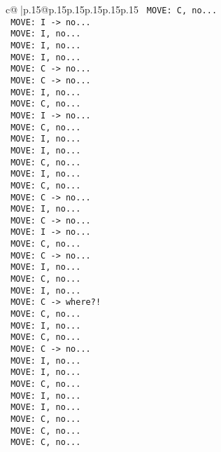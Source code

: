 \documentclass{article}
\begin{document}
{\begin{supertabular}{c@{$\;$}|p{.15\linewidth}@{}p{.15\linewidth}p{.15\linewidth}p{.15\linewidth}p{.15\linewidth}p{.15\linewidth}}
{{{\texttt{ MOVE: C, no...} \\
\texttt{ MOVE: I {-}> no...} \\
\texttt{ MOVE: I, no...} \\
\texttt{ MOVE: I, no...} \\
\texttt{ MOVE: I, no...} \\
\texttt{ MOVE: C {-}> no...} \\
\texttt{ MOVE: C {-}> no...} \\
\texttt{ MOVE: I, no...} \\
\texttt{ MOVE: C, no...} \\
\texttt{ MOVE: I {-}> no...} \\
\texttt{ MOVE: C, no...} \\
\texttt{ MOVE: I, no...} \\
\texttt{ MOVE: I, no...} \\
\texttt{ MOVE: C, no...} \\
\texttt{ MOVE: I, no...} \\
\texttt{ MOVE: C, no...} \\
\texttt{ MOVE: C {-}> no...} \\
\texttt{ MOVE: I, no...} \\
\texttt{ MOVE: C {-}> no...} \\
\texttt{ MOVE: I {-}> no...} \\
\texttt{ MOVE: C, no...} \\
\texttt{ MOVE: C {-}> no...} \\
\texttt{ MOVE: I, no...} \\
\texttt{ MOVE: C, no...} \\
\texttt{ MOVE: I, no...} \\
\texttt{ MOVE: C {-}> where?!} \\
\texttt{ MOVE: C, no...} \\
\texttt{ MOVE: I, no...} \\
\texttt{ MOVE: C, no...} \\
\texttt{ MOVE: C {-}> no...} \\
\texttt{ MOVE: I, no...} \\
\texttt{ MOVE: I, no...} \\
\texttt{ MOVE: C, no...} \\
\texttt{ MOVE: I, no...} \\
\texttt{ MOVE: I, no...} \\
\texttt{ MOVE: C, no...} \\
\texttt{ MOVE: C, no...} \\
\texttt{ MOVE: C, no...} \\
}}}
\end{supertabular}}
\end{document}
